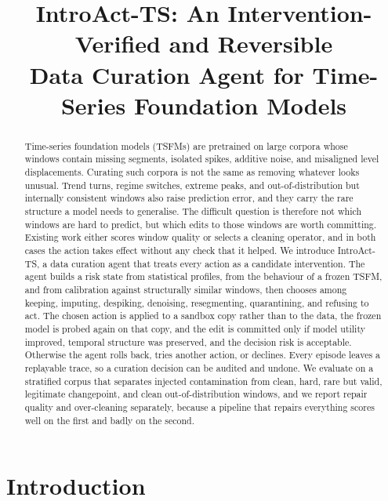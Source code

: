 \documentclass{article}
\title{IntroAct-TS: An Intervention-Verified and Reversible \\
Data Curation Agent for Time-Series Foundation Models}
\begin{document}
\maketitle

\begin{abstract}
Time-series foundation models (TSFMs) are pretrained on large corpora whose windows contain missing segments, isolated spikes, additive noise, and misaligned level displacements. Curating such corpora is not the same as removing whatever looks unusual. Trend turns, regime switches, extreme peaks, and out-of-distribution but internally consistent windows also raise prediction error, and they carry the rare structure a model needs to generalise. The difficult question is therefore not which windows are hard to predict, but which edits to those windows are worth committing. Existing work either scores window quality or selects a cleaning operator, and in both cases the action takes effect without any check that it helped. We introduce IntroAct-TS, a data curation agent that treats every action as a candidate intervention. The agent builds a risk state from statistical profiles, from the behaviour of a frozen TSFM, and from calibration against structurally similar windows, then chooses among keeping, imputing, despiking, denoising, resegmenting, quarantining, and refusing to act. The chosen action is applied to a sandbox copy rather than to the data, the frozen model is probed again on that copy, and the edit is committed only if model utility improved, temporal structure was preserved, and the decision risk is acceptable. Otherwise the agent rolls back, tries another action, or declines. Every episode leaves a replayable trace, so a curation decision can be audited and undone. We evaluate on a stratified corpus that separates injected contamination from clean, hard, rare but valid, legitimate changepoint, and clean out-of-distribution windows, and we report repair quality and over-cleaning separately, because a pipeline that repairs everything scores well on the first and badly on the second.
\end{abstract}

\section{Introduction}
\end{document}
